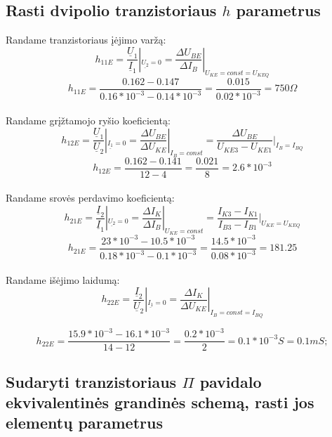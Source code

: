 \documentclass[11pt,a4paper]{article}
\begin{document}
\subsection{Rasti dvipolio tranzistoriaus $h$ parametrus}
Randame tranzistoriaus įėjimo varžą:
\begin{equation}
h_{11E} = \frac{\underline{U}_1}{\underline{I}_1}|_{\underline{U_2} = 0}
= \frac{\Delta U_{BE}}{\Delta I_B}|_{U_{KE} = const = U_{KEQ}}
\end{equation}
\[
h_{11E} = \frac{0.162-0.147}{0.16*10^{-3}-0.14*10^{-3}} = \frac{0.015}{0.02*10^{-3}} = 750 \Omega
\]\\
Randame grįžtamojo ryšio koeficientą:
\begin{equation}
h_{12E} = \frac{\underline{U}_1}{\underline{U}_2}|_{\underline{I_{1}} = 0} = \frac{\Delta U_{BE}}{\Delta U_{KE}}|_{I_{B} = const} = \frac{\Delta U_{BE}}{U_{KE3} - U_{KE1}} |_{I_B = I_{BQ}}
\end{equation}
\[
h_{12E} = \frac{0.162-0.141}{12-4} = \frac{0.021}{8} = 2.6*10^{-3}
\]\\
Randame srovės perdavimo koeficientą:
\begin{equation}
h_{21E} = \frac{\underline{I}_2}{\underline{I}_1} |_{\underline{U_{2}} = 0} = 
\frac{\Delta I_{K}}{\Delta I_{B}} |_{U_{KE} = const} = 
\frac{I_{K3} - I_{K1}}{I_{B3} - I_{B1}} |_{U_{KE} = U_{KEQ}}
\end{equation}
\[
h_{21E} = \frac{23*10^{-3}-10.5*10^{-3}}{0.18*10^{-3}-0.1*10^{-3}} = \frac{14.5*10^{-3}}{0.08*10^{-3}} = 181.25
\]\\
Randame išėjimo laidumą:
\begin{equation}
h_{22E} = \frac{\underline{I}_2}{\underline{U}_2} |_{\underline{I_1} = 0} = \frac{\Delta I_K}{\Delta U_{KE}} |_{I_B = const = I_{BQ}}
\end{equation}

\[
h_{22E} = \frac{15.9*10^{-3}-16.1*10^{-3}}{14-12} = \frac{0.2*10^{-3}}{2} = 0.1*10^{-3} S = 0.1 mS;
\]


\subsection{Sudaryti tranzistoriaus $\Pi$ pavidalo ekvivalentinės grandinės schemą, rasti jos elementų parametrus}
\end{document}
